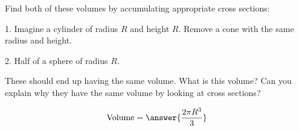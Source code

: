 \documentclass{ximera}
\author{Steven Gubkin}
\begin{document}
\begin{exercise}



Find both of these volumes by accumulating appropriate cross sections:

1.  Imagine a cylinder of radius $R$ and height $R$.  Remove a cone with the same radius and height.

2.  Half of a sphere of radius $R$.

These should end up having the same volume.  What is this volume? Can you explain why they have the same volume by looking at cross sections?

\begin{prompt}
	\[
		\textrm{Volume} = \answer{\frac{2\pi R^3}{3}}
	\]
\end{prompt}

\end{exercise}
\end{document}
